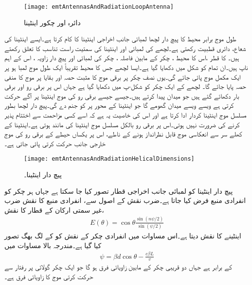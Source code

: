 \begin{figure}
\centering
\texttt{[image: emtAntennasAndRadiationLoopAntenna]}
\caption{دائرہ اور چکور اینٹینا}
\label{شکل_اینٹینا_دائرہ_چکور}
\end{figure}

طول موج برابر محیط کا پیچ دار لچھا لمبائی جانب اخراجی اینٹینا کا کام کرتا ہے۔ایسے اینٹینا کی شعاع،  دائری قطبیت رکھتی ہے۔لچھے کی لمبائی اور  اینٹینا کی سمتیت راست تناسب کا تعلق رکھتے ہیں۔ کا قطر ،اس کا محیط ، چکر کے مابین فاصلہ ، چکر کی لمبائی  اور پیچ دار زاویہ ، اس کے اہم ناپ ہیں۔ان تمام کو شکل  میں دکھایا گیا ہے۔ایسا لچھے جس  کا محیط  تقریباً  ایک طول موج  لمبا ہو پر ایک مکمل موج پائی جائے گی۔یوں نصف چکر پر برقی موج کا مثبت حصہ اور بقایا پر موج کا منفی حصہ پایا جائے گا۔ لچھے کے ایک چکر کو شکل-پ میں دکھایا گیا ہے جہاں اس پر برقی رو اور برقی بار دکھائے گئے ہیں جو میدان  پیدا کرتے ہیں۔جیسے جیسے برقی رو کی موج اینٹینا پر آگے حرکت کرتی ہے ویسے ویسے میدان  گھومے گا جو اینٹینا کے محور پر  کو جنم دے گی۔پیچ دار لچھا بطور مسلسل موج اینٹینا کردار ادا کرتا ہے اور اس کی خاصیت یہ ہے کہ اسے کسی مزاحمت سے اختتام پذیر کرنے کی ضرورت نہیں ہوتی۔اس پر برقی رو بالکل مسلسل موج اینٹینا کی مانند ہوتی ہے۔اینٹینا کے کھلے سر سے انعکاسی موج قابل نظرانداز ہونے کے ناطے، اس پر یکساں حیطے کے برقی رو کی موج خارجی جانب حرکت کرتی پائی جاتی ہے۔

\begin{figure}
\centering
\texttt{[image: emtAntennasAndRadiationHelicalDimensions]}
\caption{پیچ دار اینٹینا۔}
\label{شکل_اینٹینا_پیچ_دار_الف}
\end{figure}

پیچ دار اینٹینا کو لمبائی جانب اخراجی قطار تصور کیا جا سکتا ہے جہاں ہر چکر کو انفرادی منبع فرض کیا جاتا ہے۔ضرب نقش کے اصول سے، انفرادی منبع کا نقش ضرب غیر سمتی ارکان کے  قطار کا نقش، 
\begin{align}\label{مساوات_اینٹینا_لمبی_پیچ_دار_اینٹینا}
E(\theta)=\cos \theta \frac{\sin (n\psi\!/\!2)}{\sin(\psi\!/\!2)}
\end{align}
اینٹینے  کا نقش دیتا ہے۔اس مساوات میں انفرادی چکر کے نقش کو  کے لگ بھگ تصور کیا گیا ہے۔مندرجہ بالا مساوات میں
\begin{align}\label{مساوات_اینٹینا_لمبی_پیچ_دار_اینٹینا_زاویائی_فرق}
\psi=\beta d \cos \theta- \frac{c \beta L}{v}
\end{align}
کے برابر ہے جہاں دو قریبی چکر کے مابین زاویائی فرق  ہو گا جو  ایک چکر گولائی  پر  رفتار سے حرکت کرتی موج کا زاویائی فرق ہے۔

